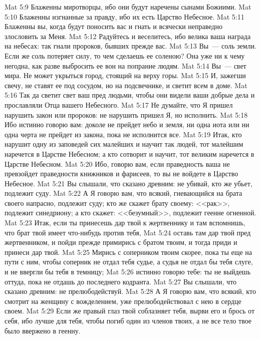 \rsbpar\vs Mat 5:9 Блаженны миротворцы, ибо они будут наречены сынами Божиими.
\rsbpar\vs Mat 5:10 Блаженны изгнанные за правду, ибо их есть Царство Небесное.
\rsbpar\vs Mat 5:11 Блаженны вы, когда будут поносить вас и гнать и всячески неправедно злословить за Меня.
\vs Mat 5:12 Радуйтесь и веселитесь, ибо велика ваша награда на небесах: так гнали  пророков, бывших прежде вас.
\rsbpar\vs Mat 5:13 Вы~--- соль земли. Если же соль потеряет силу, то чем сделаешь ее соленою? Она уже ни к чему негодна, как разве выбросить ее вон на попрание людям.
\rsbpar\vs Mat 5:14 Вы~--- свет мира. Не может укрыться город, стоящий на верху горы.
\vs Mat 5:15 И, зажегши свечу, не ставят ее под сосудом, но на подсвечнике, и светит всем в доме.
\vs Mat 5:16 Так да светит свет ваш пред людьми, чтобы они видели ваши добрые дела и прославляли Отца вашего Небесного.
\rsbpar\vs Mat 5:17 Не думайте, что Я пришел нарушить закон или пророков: не нарушить пришел Я, но исполнить.
\vs Mat 5:18 Ибо истинно говорю вам: доколе не прейдет небо и земля, ни одна иота или ни одна черта не прейдет из закона, пока не исполнится все.
\vs Mat 5:19 Итак, кто нарушит одну из заповедей сих малейших и научит так людей, тот малейшим наречется в Царстве Небесном; а кто сотворит и научит, тот великим наречется в Царстве Небесном.
\vs Mat 5:20 Ибо, говорю вам, если праведность ваша не превзойдет праведности книжников и фарисеев, то вы не войдете в Царство Небесное.
\rsbpar\vs Mat 5:21 Вы слышали, что сказано древним: не убивай, кто же убьет, подлежит суду.
\vs Mat 5:22 А Я говорю вам, что всякий, гневающийся на брата своего напрасно, подлежит суду; кто же скажет брату своему: <<рак>>, подлежит синедриону; а кто скажет: <<безумный>>, подлежит геенне огненной.
\vs Mat 5:23 Итак, если ты принесешь дар твой к жертвеннику и там вспомнишь, что брат твой имеет что-нибудь против тебя,
\vs Mat 5:24 оставь там дар твой пред жертвенником, и пойди прежде примирись с братом твоим, и тогда приди и принеси дар твой.
\vs Mat 5:25 Мирись с соперником твоим скорее, пока ты еще на пути с ним, чтобы соперник не отдал тебя судье, а судья не отдал бы тебя слуге, и не ввергли бы тебя в темницу;
\vs Mat 5:26 истинно говорю тебе: ты не выйдешь оттуда, пока не отдашь до последнего кодранта.
\rsbpar\vs Mat 5:27 Вы слышали, что сказано древним: не прелюбодействуй.
\vs Mat 5:28 А Я говорю вам, что всякий, кто смотрит на женщину с вожделением, уже прелюбодействовал с нею в сердце своем.
\vs Mat 5:29 Если же правый глаз твой соблазняет тебя, вырви его и брось от себя, ибо лучше для тебя, чтобы погиб один из членов твоих, а не все тело твое было ввержено в геенну.
